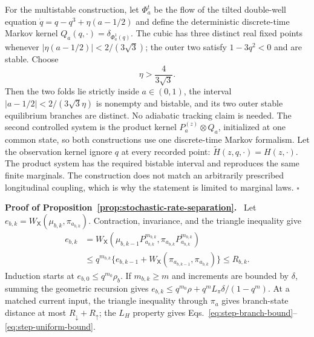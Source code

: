 \documentclass[pdflatex,sn-mathphys-num]{sn-jnl}
\newcommand{\inlinehead}[1]{\par\smallskip\noindent\textbf{#1}\ }
\begin{document}
\begin{appendices}
For the multistable construction, let $\Phi_a^t$ be the flow of the tilted double-well equation $\dot q=q-q^3+\eta(a-1/2)$ and define the deterministic discrete-time Markov kernel $Q_a(q,\cdot)=\delta_{\Phi_a^1(q)}$. The cubic has three distinct real fixed points whenever $|\eta(a-1/2)|<2/(3\sqrt3)$; the outer two satisfy $1-3q^2<0$ and are stable. Choose
\begin{equation}
\eta>\frac{4}{3\sqrt3}.
\end{equation}
Then the two folds lie strictly inside $a\in(0,1)$, the interval $|a-1/2|<2/(3\sqrt3\eta)$ is nonempty and bistable, and its two outer stable equilibrium branches are distinct. No adiabatic tracking claim is needed. The second controlled system is the product kernel $P_a^{(z)}\otimes Q_a$, initialized at one common state, so both constructions use one discrete-time Markov formalism. Let the observation kernel ignore $q$ at every recorded point: $\widetilde H(z,q,\cdot)=H(z,\cdot)$. The product system has the required bistable interval and reproduces the same finite marginals. The construction does not match an arbitrarily prescribed longitudinal coupling, which is why the statement is limited to marginal laws. \hfill$\square$

\inlinehead{Proof of Proposition~\ref{prop:stochastic-rate-separation}.} Let $e_{b,k}=W_{\mathsf X}(\mu_{b,k},\pi_{a_{b,k}})$. Contraction, invariance, and the triangle inequality give
\begin{align}
e_{b,k}
&=W_{\mathsf X}(\mu_{b,k-1}P_{a_{b,k}}^{m_{b,k}},
\pi_{a_{b,k}}P_{a_{b,k}}^{m_{b,k}})\\
&\le q^{m_{b,k}}
\{e_{b,k-1}+W_{\mathsf X}(\pi_{a_{b,k-1}},\pi_{a_{b,k}})\}
\le R_{b,k}.
\end{align}
Induction starts at $e_{b,0}\le q^{m_0}\rho_b$. If $m_{b,k}\ge m$ and increments are bounded by $\delta$, summing the geometric recursion gives $e_{b,k}\le q^{m_0}\rho+q^mL_\pi\delta/(1-q^m)$. At a matched current input, the triangle inequality through $\pi_a$ gives branch-state distance at most $R_\downarrow+R_\uparrow$; the $L_H$ property gives Eqs.~\eqref{eq:step-branch-bound}--\eqref{eq:step-uniform-bound}.


\end{appendices}
\end{document}
